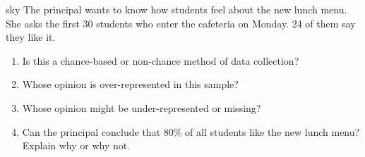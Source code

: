 \documentclass[10pt]{article}
\begin{document}
\namedateperiod

\vspace{0.14in}

\begin{scenariobox}[Context]{sky}
\small
The principal wants to know how students feel about the new lunch menu. She asks
the first 30 students who enter the cafeteria on Monday. 24 of them say they like it.
\end{scenariobox}

\vspace{0.1in}

\begin{practicebox}
\small
\begin{enumerate}[leftmargin=1.5em, itemsep=10pt]
  \item Is this a chance-based or non-chance method of data collection?\\
        \blank{9cm}

  \item Whose opinion is over-represented in this sample?\\
        \writeline

  \item Whose opinion might be under-represented or missing?\\
        \writeline

  \item Can the principal conclude that 80\% of all students like the new lunch menu?
        Explain why or why not.\\
        \writeline\\[1pt]\writeline\\[1pt]\writeline
\end{enumerate}
\end{practicebox}
\end{document}
